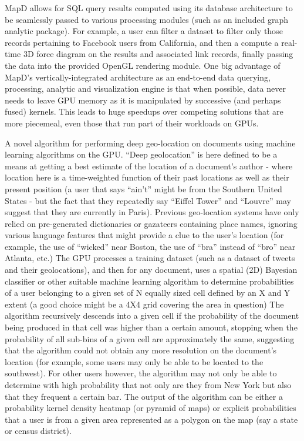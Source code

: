 \documentclass[twocolumn]{article}
\newcommand{\ii}{\item}
\begin{document}
\ii MapD allows for SQL query results computed using its database architecture to be seamlessly passed to various processing modules (such as an included graph analytic package). For example, a user can filter a dataset to filter only those records pertaining to Facebook users from California, and then a compute a real-time 3D force diagram on the results and associated link records, finally passing the data into the provided OpenGL rendering module. One big advantage of MapD’s vertically-integrated architecture as an end-to-end data querying, processing, analytic and visualization engine is that when possible, data never needs to leave GPU memory as it is manipulated by successive (and perhaps fused) kernels. This leads to huge speedups over competing solutions that are more piecemeal, even those that run part of their workloads on GPUs.
\ii A novel algorithm for performing deep geo-location on documents using machine learning algorithms on the GPU. “Deep geolocation” is here defined to be a means at getting a best estimate of the location of a document’s author - where location here is a time-weighted function of their past locations as well as their present position (a user that says “ain’t” might be from the Southern United States - but the fact that they repeatedly say “Eiffel Tower” and “Louvre” may suggest that they are currently in Paris). Previous geo-location systems have only relied on pre-generated dictionaries or gazateers containing place names, ignoring various language features that might provide a clue to the user’s location (for example, the
use of “wicked” near Boston, the use of “bra” instead of “bro” near Atlanta, etc.) The GPU processes a training dataset (such as a dataset of tweets and their geolocations), and then for any document, uses a spatial (2D) Bayesian classifier or other suitable machine learning algorithm to determine probabilities of a user belonging to a given set of N equally sized cell defined by an X and Y extent (a good choice might be a 4X4 grid covering the area in question) The algorithm recursively descends into a given cell if the probability of the document being produced in that cell was higher than a certain amount, stopping when the probability of all sub-bins of a given cell are approximately the same, suggesting that the algorithm could not obtain any more resolution on the document’s location (for example, some users may only be able to be located to the southwest). For other users however, the algorithm may not only be able to determine with high probability that not only are they from New York but also that they frequent a certain bar. The output of the algorithm can be either a probability kernel density heatmap (or pyramid of maps) or explicit probabilities that a user is from a given area represented as a polygon on the map (say a state or census district).
\end{document}
